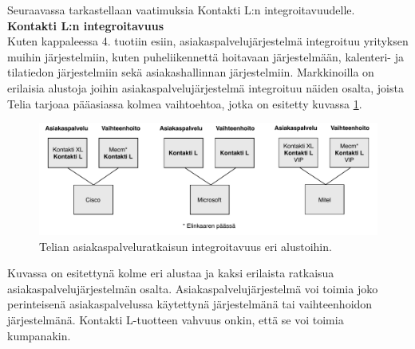\documentclass[finnish,12pt,a4paper,pdftex]{article}
\begin{document}
Seuraavassa tarkastellaan vaatimuksia Kontakti L:n integroitavuudelle.\\

\textbf{Kontakti L:n integroitavuus}\\

\noindent Kuten kappaleessa 4. tuotiin esiin, asiakaspalvelujärjestelmä integroituu yrityksen muihin järjestelmiin, kuten puheliikennettä hoitavaan järjestelmään, kalenteri- ja tilatiedon järjestelmiin sekä asiakashallinnan järjestelmiin. Markkinoilla on erilaisia alustoja joihin asiakaspalvelujärjestelmä integroituu näiden osalta, joista Telia tarjoaa pääasiassa kolmea vaihtoehtoa, jotka on esitetty kuvassa \ref{fig:palvelumal}.\\

\begin{figure}[!h]
    \centering
    \includegraphics[scale=0.7]{images/integroitavuus.pdf}
    \caption{Telian asiakaspalveluratkaisun integroitavuus eri alustoihin.}
    \label{fig:palvelumal}
\end{figure}



\noindent Kuvassa on esitettynä kolme eri alustaa ja kaksi erilaista ratkaisua asiakaspalvelujärjestelmän osalta. Asiakaspalvelujärjestelmä voi toimia joko perinteisenä asiakaspalvelussa käytettynä järjestelmänä tai vaihteenhoidon järjestelmänä. Kontakti L-tuotteen vahvuus onkin, että se voi toimia kumpanakin.\\
\end{document}
